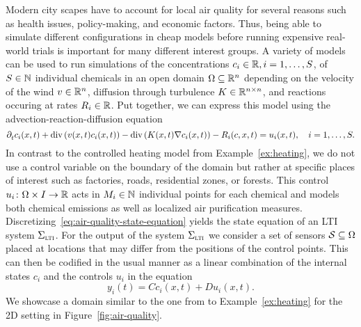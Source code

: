 \begin{example}
    Modern city scapes have to account for local air quality for several reasons such as health issues, policy-making, and economic factors.
    Thus, being able to simulate different configurations in cheap models before running expensive real-world trials is important for many different interest groups.
    A variety of models can be used to run simulations of the concentrations $c_i \in \bb{R}, i = 1, \dots, S$, of $S \in \bb{N}$ individual chemicals in an open domain $\Omega \subseteq \bb{R}^n$ depending on the velocity of the wind $v \in \bb{R}^n$, diffusion through turbulence $K \in \bb{R}^{n \times n}$, and reactions occuring at rates $R_i \in \bb{R}$.
    Put together, we can express this model using the advection-reaction-diffusion equation
    \begin{equation}\label{eq:air-quality-state-equation}
        \pd[t]{} c_i(x, t) + \dvg{v(x, t) c_i(x, t)} - \dvg{K(x, t) \nabla c_i(x, t)} - R_i(c, x, t) = u_i(x, t),\quad i = 1, \dots, S.
    \end{equation}
    In contrast to the controlled heating model from Example~\ref{ex:heating}, we do not use a control variable on the boundary of the domain but rather at specific places of interest such as factories, roads, residential zones, or forests.
    This control $u_i \colon \Omega \times I \to \bb{R}$ acts in $M_i \in \bb{N}$ individual points for each chemical and models both chemical emissions as well as localized air purification measures.
    Discretizing~\eqref{eq:air-quality-state-equation} yields the state equation of an \ac{LTI} system $\Sigma_{\msc{lti}}$.
    For the output of the system $\Sigma_{\msc{lti}}$ we consider a set of sensors $\mcl{S} \subseteq \Omega$ placed at locations that may differ from the positions of the control points.
    This can then be codified in the usual manner as a linear combination of the internal states $c_i$ and the controls $u_i$ in the equation
    \begin{equation*}
        y_i(t) = C c_i(x, t) + D u_i(x, t).
    \end{equation*}
    We showcase a domain similar to the one from to Example~\ref{ex:heating} for the 2D setting in Figure~\ref{fig:air-quality}.

    \begin{figure}[h]
        \centering
\end{figure}
\end{example}
